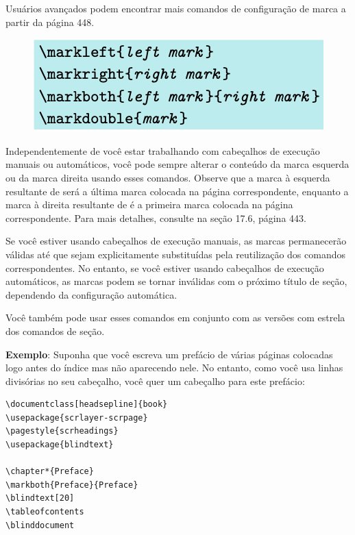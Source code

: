 Usuários avançados podem encontrar mais comandos de configuração de marca a partir da página 448.

\begin{figure}[h]
    \centering
    \includegraphics[width=0.5\linewidth]{imagem09.png}
\end{figure}

Independentemente de você estar trabalhando com cabeçalhos de execução manuais ou automáticos, você pode sempre alterar o conteúdo da marca esquerda ou da marca direita usando esses comandos. Observe que a marca à esquerda resultante de  será a última marca colocada na página correspondente, enquanto a marca à direita resultante de  é a primeira marca colocada na página correspondente. Para mais detalhes, consulte  na seção 17.6, página 443.

Se você estiver usando cabeçalhos de execução manuais, as marcas permanecerão válidas até que sejam explicitamente substituídas pela reutilização dos comandos correspondentes. No entanto, se você estiver usando cabeçalhos de execução automáticos, as marcas podem se tornar inválidas com o próximo título de seção, dependendo da configuração automática.

Você também pode usar esses comandos em conjunto com as versões com estrela dos comandos de seção.

\textbf{Exemplo}: Suponha que você escreva um prefácio de várias páginas colocadas logo antes do índice mas não aparecendo nele. No entanto, como você usa linhas divisórias no seu cabeçalho, você quer um cabeçalho para este prefácio:
\begin{verbatim}
\documentclass[headsepline]{book}
\usepackage{scrlayer-scrpage}
\pagestyle{scrheadings}
\usepackage{blindtext}

\chapter*{Preface}
\markboth{Preface}{Preface}
\blindtext[20]
\tableofcontents
\blinddocument
    
\end{verbatim}

